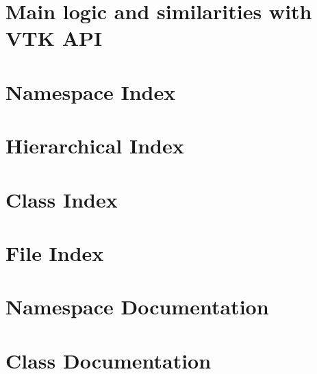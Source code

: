 \let\mypdfximage\pdfximage\def\pdfximage{\immediate\mypdfximage}\documentclass[twoside]{book}
\newcommand{\+}{\discretionary{\mbox{\scriptsize$\hookleftarrow$}}{}{}}
\begin{document}
\chapter{Main logic and similarities with V\+TK A\+PI}
\label{md_doc_vtkstyle}

\chapter{Namespace Index}

\chapter{Hierarchical Index}

\chapter{Class Index}

\chapter{File Index}

\chapter{Namespace Documentation}

\chapter{Class Documentation}
































\end{document}
